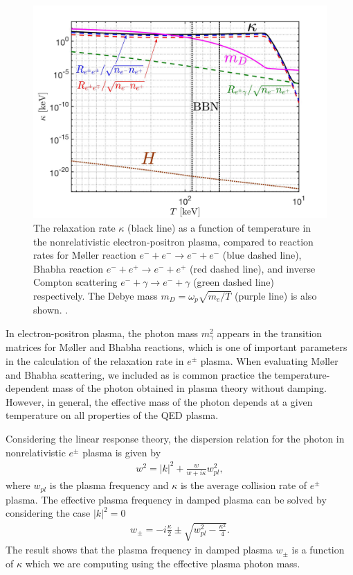 \begin{figure} 
\centerline{\includegraphics[width=0.9\linewidth]{./plots/May152023Kappa_EPPlasma}}
\caption{The relaxation rate $\kappa$ (black line) as a function of temperature in the nonrelativistic electron-positron plasma, compared to reaction rates for M{\o}ller reaction $e^-+e^-\to e^-+e^-$ (blue dashed line), Bhabha reaction $e^-+e^+\to e^-+e^+$ (red dashed line), and inverse Compton scattering $e^-+\gamma\to e^-+\gamma$ (green dashed line) respectively. The Debye mass $m_D=\omega_{p}\sqrt{m_e/T}$ (purple line) is also shown. . }
\label{RelaxationRate:fig}
\end{figure}


In electron-positron plasma, the photon mass $m_\gamma^2$ appears in the transition matrices for M{\o}ller and Bhabha reactions, which is one of important parameters in the calculation of the relaxation rate in $e^\pm$ plasma. When evaluating M{\o}ller and Bhabha scattering, we included as is common practice the temperature-dependent mass of the photon obtained in plasma theory without damping. However, in general, the effective mass of the photon depends at a given temperature on all properties of the QED plasma. 

Considering the linear response theory, the dispersion relation for the photon in nonrelativistic $e^\pm$ plasma is given by~\cite{Formanek:2021blc}
\begin{align}\label{dispersion_damping}
w^2=|k|^2+\frac{w}{w+i\kappa}w_{pl}^2,
\end{align}
where $w_{pl}$ is the plasma frequency and $\kappa$ is the average collision rate of $e^\pm$ plasma. The effective plasma frequency in damped plasma can be solved by considering the case $|k|^2=0$~\cite{Formanek:2021blc}
\begin{align}\label{plasmafrequency_damped}
w_{\pm}=-i\frac{\kappa}{2}\pm\sqrt{w^2_{pl}-\frac{\kappa^2}{4}}.
\end{align}
The result shows that the plasma frequency in damped plasma $w_\pm$ is a function of $\kappa$ which we are computing using the effective plasma photon mass. 

